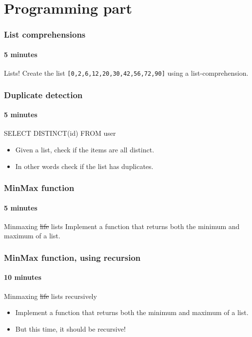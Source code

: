 \section{Programming part}
\label{sec:programming_part}


\begin{frame}
	\frametitle{List comprehensions}
	\framesubtitle{5 minutes}
	\begin{problemblock}{Lists!}
		Create the list \texttt{[0,2,6,12,20,30,42,56,72,90]} using a list-comprehension.
	\end{problemblock}
\end{frame}

\begin{frame}
	\frametitle{Duplicate detection}
	\framesubtitle{5 minutes}
	\begin{problemblock}{SELECT DISTINCT(id) FROM user}
		\begin{itemize}
			\item Given a list, check if the items are all distinct. 
			\item In other words check if the list has duplicates.
		\end{itemize}	
	\end{problemblock}
\end{frame}

\begin{frame}
	\frametitle{MinMax function}
	\framesubtitle{5 minutes}

	\begin{problemblock}{Minmaxing \st{life} lists}
		Implement a function that returns both the minimum and maximum of a list.
	\end{problemblock}
\end{frame}

\begin{frame}
	\frametitle{MinMax function, using recursion}
	\framesubtitle{10 minutes}

	\begin{problemblock}{Minmaxing \st{life} lists recursively}
		\begin{itemize}
			\item Implement a function that returns both the minimum and maximum of a list.
			\item But this time, it should be recursive!
		\end{itemize}
	\end{problemblock}
\end{frame}
